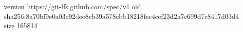 version https://git-lfs.github.com/spec/v1
oid sha256:8a70bf9e0a03c92dee8cb39a578ebb18218fee4cef23d2a7e699d7c8417d03d4
size 165814

